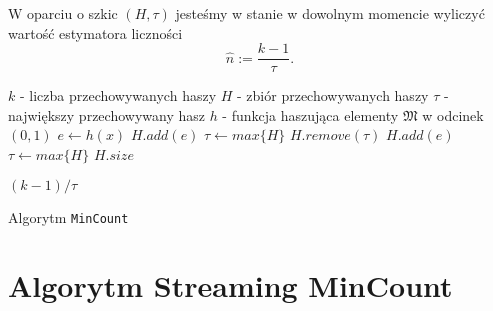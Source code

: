 W oparciu o szkic $(H, {\tau})$ jesteśmy w stanie w dowolnym momencie wyliczyć wartość estymatora liczności $$\hat{n} := \frac{k - 1}{{\tau}}.$$

\begin{algorithm}
    \begin{algorithmic}
    \State $k$ -  liczba przechowywanych haszy 
    \State $H  $ - zbiór przechowywanych haszy
    \State $\tau  $ - największy przechowywany hasz 
    \State $h  $ - funkcja haszująca elementy $\mathfrak{M}$ w odcinek $(0, 1)$
    \newline
        \State $e \gets h(x)$
                \State $H.add(e)$
                \State $\tau \gets max\{H\}$
                \State $H.remove(\tau)$
                \State $H.add(e)$
                \State $\tau \gets max\{H\}$
            \EndIf
        \EndIf
    \EndFunction
    \newline
            \State \Return $H.size$
        
        \Else 
            \State \Return $(k - 1) / \tau$
        \EndIf
    \EndFunction
    
    \end{algorithmic}
    \caption{Algorytm \texttt{MinCount}}
\end{algorithm}

\newpage

\section{Algorytm Streaming MinCount}

